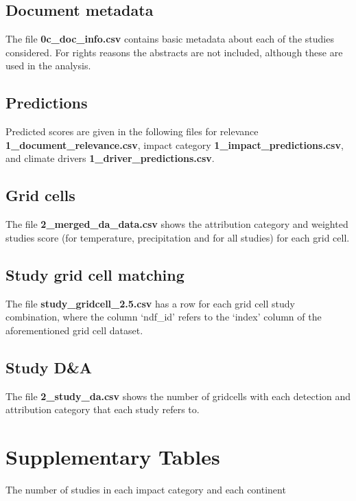 \documentclass{article}
\begin{document}
	\subsection{Document metadata}
	The file \textbf{0c\_doc\_info.csv} contains basic metadata about each of the studies considered. For rights reasons the abstracts are not included, although these are used in the analysis.
	
	\subsection{Predictions}
	
	Predicted scores are given in the following files for relevance \textbf{1\_document\_relevance.csv}, impact category \textbf{1\_impact\_predictions.csv}, and climate drivers \textbf{1\_driver\_predictions.csv}.
	
	\subsection{Grid cells}
	
	The file \textbf{2\_merged\_da\_data.csv} shows the attribution category and weighted studies score (for temperature, precipitation and for all studies) for each grid cell.
	
	\subsection{Study grid cell matching}
	The file \textbf{study\_gridcell\_2.5.csv} has a row for each grid cell study combination, where the column `ndf\_id' refers to the `index' column of the aforementioned grid cell dataset.
	
	\subsection{Study D\&A}
	The file \textbf{2\_study\_da.csv} shows the number of gridcells with each detection and attribution category that each study refers to.
	
	\section{Supplementary Tables}	
	\begin{table}
		\scriptsize
		\center
		
		\caption{The number of studies in each impact category and each continent}
	\end{table}
\end{document}
